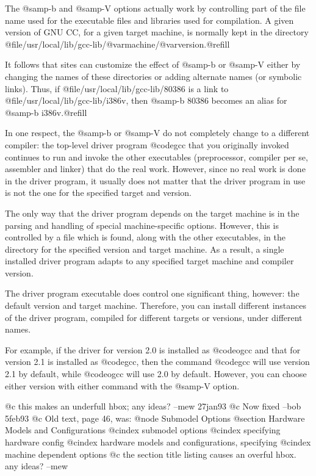 {{The @samp{-b} and @samp{-V} options actually work by controlling part of
the file name used for the executable files and libraries used for
compilation.  A given version of GNU CC, for a given target machine, is
normally kept in the directory @file{/usr/local/lib/gcc-lib/@var{machine}/@var{version}}.@refill

It follows that sites can customize the effect of @samp{-b} or @samp{-V}
either by changing the names of these directories or adding
alternate names (or symbolic links).  Thus, if
@file{/usr/local/lib/gcc-lib/80386} is a link to
@file{/usr/local/lib/gcc-lib/i386v}, then @samp{-b 80386} becomes an alias
for @samp{-b i386v}.@refill

In one respect, the @samp{-b} or @samp{-V} do not completely change
to a different compiler: the top-level driver program @code{gcc}
that you originally invoked continues to run and invoke the other
executables (preprocessor, compiler per se, assembler and linker)
that do the real work.  However, since no real work is done in the
driver program, it usually does not matter that the driver program
in use is not the one for the specified target and version.

The only way that the driver program depends on the target machine is
in the parsing and handling of special machine-specific options.
However, this is controlled by a file which is found, along with the
other executables, in the directory for the specified version and
target machine.  As a result, a single installed driver program adapts
to any specified target machine and compiler version.

The driver program executable does control one significant thing,
however: the default version and target machine.  Therefore, you can
install different instances of the driver program, compiled for
different targets or versions, under different names.

For example, if the driver for version 2.0 is installed as @code{ogcc}
and that for version 2.1 is installed as @code{gcc}, then the command
@code{gcc} will use version 2.1 by default, while @code{ogcc} will use
2.0 by default.  However, you can choose either version with either
command with the @samp{-V} option.

@c this makes an underfull hbox; any ideas?  --mew 27jan93
@c Now fixed --bob 5feb93
@c Old text, page 46, was:
@node Submodel Options
@section Hardware Models and Configurations
@cindex submodel options
@cindex specifying hardware config
@cindex hardware models and configurations, specifying
@cindex machine dependent options
@c the section title listing causes an overful hbox.  any ideas?  --mew 

}}
